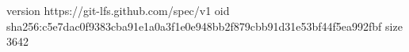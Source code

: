 version https://git-lfs.github.com/spec/v1
oid sha256:c5e7dac0f9383cba91e1a0a3f1e0e948bb2f879cbb91d31e53bf44f5ea992fbf
size 3642
